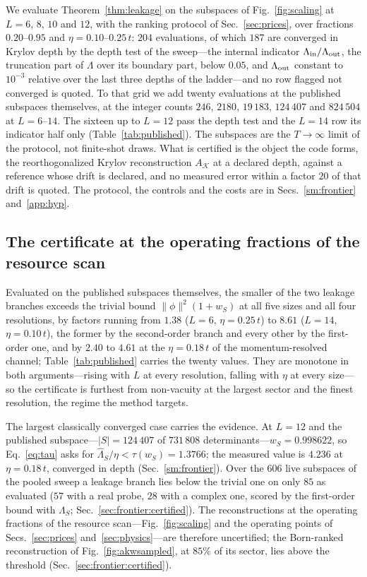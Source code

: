 We evaluate Theorem~\ref{thm:leakage} on the subspaces of Fig.~\ref{fig:scaling} at $L=6$, $8$, $10$ and
$12$, with the ranking protocol of Sec.~\ref{sec:prices}, over fractions
$0.20$--$0.95$ and $\eta=0.10$--$0.25\,t$: $204$ evaluations, of which $187$ are converged in Krylov
depth by the depth test of the sweep---the internal indicator $\Lambda_{\rm in}/\Lambda_{\rm out}$, the
truncation part of $\Lambda$ over its boundary part, below $0.05$, and $\Lambda_{\rm out}$ constant to
$10^{-3}$ relative over the last three depths of the ladder---and no row flagged not converged is
quoted. To that grid we add twenty evaluations at the
published subspaces themselves, at the integer counts $246$, $2180$, $19\,183$, $124\,407$ and
$824\,504$ at $L=6$--$14$. The sixteen up to $L=12$ pass the depth test and the $L=14$ row its
indicator half only (Table~\ref{tab:published}). The subspaces are the $T\to\infty$ limit of the
protocol, not finite-shot draws. What is certified is the object the code forms, the reorthogonalized
Krylov reconstruction $A_{\mathcal K}$ at a declared depth, against a reference whose drift is declared,
and no measured error within a factor $20$ of that drift is quoted. The protocol, the controls and the
costs are in Secs.~\ref{sm:frontier} and~\ref{app:hyp}.

\subsection{The certificate at the operating fractions of the resource scan}
\label{sec:frontier:threshold}

Evaluated on the published subspaces themselves, the smaller
of the two leakage branches exceeds the trivial bound $\lVert\phi\rVert^{2}(1+w_S)$ at all five sizes
and all four resolutions, by factors running from $1.38$ ($L=6$, $\eta=0.25\,t$) to $8.61$ ($L=14$,
$\eta=0.10\,t$), the former by the second-order branch and every other by the first-order one, and by
$2.40$ to $4.61$ at the $\eta=0.18\,t$ of the momentum-resolved channel;
Table~\ref{tab:published} carries the twenty values. They are monotone in both
arguments---rising with $L$ at every resolution, falling with $\eta$ at every size---so the certificate
is furthest from non-vacuity at the largest sector and the finest resolution, the regime the method
targets.

The largest classically converged case carries the evidence. At $L=12$ and the published
subspace---$\lvert S\rvert=124\,407$ of $731\,808$ determinants---$w_S=0.998622$, so
Eq.~\eqref{eq:tau} asks for $\widehat\Lambda_S/\eta<\tau(w_S)=1.3766$; the measured value is $4.236$
at $\eta=0.18\,t$, converged in depth (Sec.~\ref{sm:frontier}). Over the $606$ live subspaces of the
pooled sweep a leakage branch lies below the trivial one on only $85$ as evaluated ($57$ with a real probe, $28$ with a
complex one, scored by the first-order bound with $\Lambda_S$; Sec.~\ref{sec:frontier:certified}). The reconstructions at
the operating fractions of the resource scan---Fig.~\ref{fig:scaling} and the operating points of
Secs.~\ref{sec:prices} and~\ref{sec:physics}---are therefore uncertified; the Born-ranked
reconstruction of Fig.~\ref{fig:akwsampled}, at $85\%$ of its sector, lies above the threshold
(Sec.~\ref{sec:frontier:certified}).

